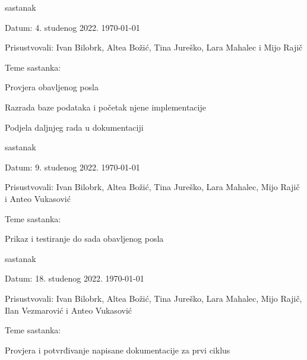 \documentclass{article}
\begin{document}
\begin{packed_enum}
		\item sastanak
		\item[] \begin{packed_item}
		\item Datum: 4. studenog 2022. \today
		\item Prisustvovali:  Ivan Bilobrk, Altea Božić, Tina Jureško, Lara Mahalec i Mijo Rajič
		\item Teme sastanka:
		\begin{packed_item}
			\item  Provjera obavljenog posla
			\item  Razrada baze podataka i početak njene implementacije
			\item  Podjela daljnjeg rada u dokumentaciji
		\end{packed_item}
	\end{packed_item}

		\item sastanak
		\item[] \begin{packed_item}
			\item Datum: 9. studenog 2022. \today
			\item Prisustvovali:  Ivan Bilobrk, Altea Božić, Tina Jureško, Lara Mahalec, Mijo Rajič i Anteo Vukasović
			\item Teme sastanka:
			\begin{packed_item}
				\item  Prikaz i testiranje do sada obavljenog posla
			\end{packed_item}
		\end{packed_item}
	
	\eject
	
	\item sastanak
	\item[] \begin{packed_item}
		\item Datum: 18. studenog 2022. \today
		\item Prisustvovali:  Ivan Bilobrk, Altea Božić, Tina Jureško, Lara Mahalec, Mijo Rajič, Ilan Vezmarović i Anteo Vukasović
		\item Teme sastanka:
		\begin{packed_item}
			\item  Provjera i potvrđivanje napisane dokumentacije za prvi ciklus
		\end{packed_item}
	\end{packed_item}
	\end{packed_enum}
	\eject
\end{document}
